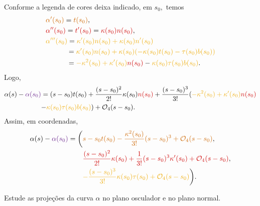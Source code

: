 \documentclass[../differential_geometry.tex]{subfiles}
\begin{document}
Conforme a legenda de cores deixa indicado, em \(s_{0},\) temos
\begin{align*}
	 & {\color{DarkOrange3}\alpha '(s_{0})}={\color{DarkOrange3}t(s_{0})},                                                                                            \\
	 & {\color{Red3}\alpha ''(s_{0})}={\color{Red3}t'(s_{0})}={\color{Red3}\kappa (s_{0})n(s_{0})},                                                                   \\
	 & {\color{DarkGoldenrod2}\alpha'''(s_{0})}={\color{DarkGoldenrod2}\kappa '(s_{0})n(s_{0})+\kappa (s_{0})n'(s_{0})}                                               \\
	 & \quad\quad\quad  = {\color{DarkGoldenrod2}\kappa '(s_{0})n(s_{0})+\kappa (s_{0})(-\kappa(s_{0})t(s_{0})-\tau (s_{0})b(s_{0}))}                                 \\
	 & \quad\quad\quad = {\color{DarkGoldenrod2}-\kappa^{2}(s_{0})+\kappa '(s_{0})}{\color{Red3}n(s_{0})}-{\color{DarkGoldenrod2}\kappa (s_{0})\tau (s_{0})b(s_{0})}.
\end{align*}
Logo,
\begin{align*}
	\alpha (s)-{\color{DarkOrchid4}\alpha (s_{0})} & = (s-s_{0})t(s_{0}) + \frac{(s-s_{0})^{2}}{2!}\kappa (s_{0}){\color{Red3}n(s_{0})}+\frac{(s-s_{0})^{3}}{3!}({\color{DarkGoldenrod2}-\kappa^{2}(s_{0})+\kappa '(s_{0})}{\color{Red3}n(s_{0})} \\
	                                               & {-\color{DarkGoldenrod2}\kappa (s_{0})\tau (s_{0})b(s_{0})}) + \mathcal{O}_{4}(s-s_{0}).
\end{align*}
Assim, em coordenadas,
\begin{align*}
	\alpha (s)-{\color{DarkOrchid4}\alpha (s_{0})}  = \biggl( & {\color{DarkOrange3}s-s_{0}t(s_{0}) - \frac{\kappa^{2}(s_{0})}{3!}(s-s_{0})^{3}+\mathcal{O}_{4}(s-s_{0})},                \\
	                                                          & {\color{Red3}\frac{(s-s_{0})^{2}}{2!}\kappa (s_{0})+\frac{1}{3!}(s-s_{0})^{3}\kappa '(s_{0}) + \mathcal{O}_{4}(s-s_{0})}, \\
	                                                          & {\color{DarkGoldenrod2}-\frac{(s-s_{0})^{3}}{3!}\kappa (s_{0})\tau (s_{0})+ \mathcal{O}_{4}(s-s_{0})}\biggr).
\end{align*}
\begin{exr}
	Estude as projeções da curva \(\alpha \) no plano osculador e no plano normal.
\end{exr}
\end{document}
